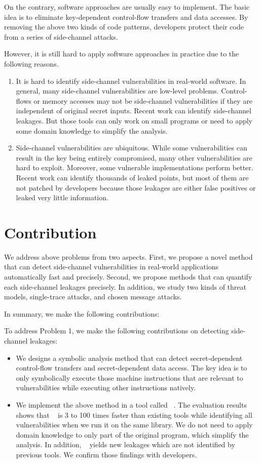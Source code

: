 On the contrary, software approaches are
usually easy to implement. The basic idea is to eliminate key-dependent
control-flow transfers and data accesses. By removing the above two kinds of code patterns, developers protect their 
code from a series of side-channel attacks.


However, it is still hard to apply software approaches in practice due to the following reasons.

\begin{enumerate}
    \item It is hard to identify side-channel vulnerabilities in real-world software. In general, many side-channel vulnerabilities are low-level problems. Control-flows or memory accesses may not be side-channel vulnerabilities if they are independent of original secret inputs. Recent work can identify side-channel leakages. But those tools can only work on small programs or need to apply some domain knowledge to simplify the analysis. 
    \item Side-channel vulnerabilities are ubiquitous. While some vulnerabilities can result in the key being entirely compromised, many other vulnerabilities are hard to exploit. Moreover, some vulnerable implementations perform better. Recent work can identify thousands of leaked points, but most of them are not patched by developers because those leakages are either false positives or leaked very little information.  
\end{enumerate}


\section{Contribution}
We address above problems from two aspects. First, we propose a novel method that can detect side-channel vulnerabilities in real-world applications automatically fast and precisely. Second, we propose methods that can quantify each side-channel leakages precisely. In addition, we study two kinds of threat models, single-trace attacks, and chosen message attacks.

In summary, we make the following contributions:

To address Problem 1, we make the following contributions on detecting side-channel leakages:

\begin{itemize}
    \item We designs a symbolic analysis method that can detect secret-dependent control-flow transfers and secret-dependent data access. The key idea is to only symbolically execute those machine instructions that are relevant to vulnerabilities while executing other instructions natively.
    \item We implement the above method in a tool called ~\detect{}. The evaluation results shows that ~\detect{}  is 3 to 100 times faster than existing tools while identifying all vulnerabilities when we run it on the same library.  We do not need to apply domain knowledge to only part of the original program, which simplify the analysis. In addition, ~\detect{} yields new leakages which are not identified by previous tools. We confirm those findings with developers.
\end{itemize}

